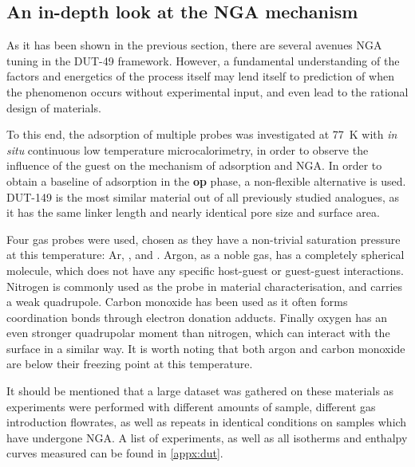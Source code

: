 
\subsection{An in-depth look at the NGA mechanism}%
\label{dut:indepth}

As it has been shown in the previous section, there are 
several avenues NGA tuning in the DUT-49 framework.
However, a fundamental understanding of the factors and 
energetics of the process itself may
lend itself to prediction of when the phenomenon occurs without 
experimental input, and even lead to the rational design of 
materials.

To this end, the adsorption of multiple probes was investigated 
at \SI{77}{\kelvin} with \textit{in situ} continuous low 
temperature microcalorimetry,
in order to observe the influence of the guest on the mechanism of
adsorption and NGA. In order to obtain a baseline of adsorption in 
the \textbf{op} phase, a non-flexible alternative is used. 
DUT-149 is the most similar material out of all previously studied
analogues, as it has the same linker length and nearly identical pore
size and surface area. 

Four gas probes were used, chosen as they 
have a non-trivial saturation pressure at this temperature: Ar,
,  and . Argon, as a 
noble gas, has a completely spherical molecule, which does not 
have any specific host-guest or guest-guest interactions. Nitrogen
is commonly used as the probe in material characterisation, 
and carries a weak quadrupole. Carbon monoxide has been used 
as it often forms coordination bonds through electron donation adducts.
Finally oxygen has an even stronger quadrupolar moment than 
nitrogen, which can interact with the surface in a similar way.
It is worth noting that both argon and carbon monoxide are below 
their freezing point at this temperature. 

It should be mentioned that a large dataset was gathered
on these materials as experiments were performed with different 
amounts of sample, different gas introduction flowrates, as well as repeats
in identical conditions on samples which have undergone NGA. A list 
of experiments, as well as all isotherms and enthalpy curves measured can
be found in \autoref{appx:dut}.

